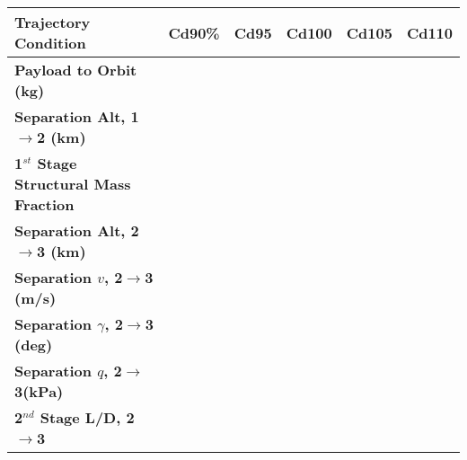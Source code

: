 \begin{table}[ht]
\begin{tabular}{l c c c c c} 
	\hline \textbf{Trajectory Condition}
	&Cd90\%
	&Cd95
	&Cd100
	&Cd105
	&Cd110
	\\
	\hline \textbf{Payload to Orbit (kg)}
	& \PayloadToOrbitCdninetypercent
	& \PayloadToOrbitCdninetyfivepercent
	& \PayloadToOrbitCdonehundredpercent
	& \PayloadToOrbitCdonehundredandfivepercent
	& \PayloadToOrbitCdonehundredandtenpercent
	\\
	\textbf{Separation Alt, 1$\rightarrow$2 (km)}
	& \firstsecondSeparationAltCdninetypercent
	& \firstsecondSeparationAltCdninetyfivepercent
	& \firstsecondSeparationAltCdonehundredpercent
	& \firstsecondSeparationAltCdonehundredandfivepercent
	& \firstsecondSeparationAltCdonehundredandtenpercent
	\\
	\textbf{1$^{st}$ Stage Structural Mass Fraction}
	& \FirstStageSMFCdninetypercent
	& \FirstStageSMFCdninetyfivepercent
	& \FirstStageSMFCdonehundredpercent
	& \FirstStageSMFCdonehundredandfivepercent
	& \FirstStageSMFCdonehundredandtenpercent
	\\
	\textbf{Separation Alt, 2$\rightarrow$3 (km)}
	& \secondthirdSeparationAltCdninetypercent
	& \secondthirdSeparationAltCdninetyfivepercent
	& \secondthirdSeparationAltCdonehundredpercent
	& \secondthirdSeparationAltCdonehundredandfivepercent
	& \secondthirdSeparationAltCdonehundredandtenpercent
	\\
	\textbf{Separation $v$, 2$\rightarrow$3 (m/s)}
	& \secondthirdSeparationvCdninetypercent
	& \secondthirdSeparationvCdninetyfivepercent
	& \secondthirdSeparationvCdonehundredpercent
	& \secondthirdSeparationvCdonehundredandfivepercent
	& \secondthirdSeparationvCdonehundredandtenpercent
	\\
	\textbf{Separation $\gamma$, 2$\rightarrow$3 (deg)}
	& \secondthirdSeparationgammaCdninetypercent
	& \secondthirdSeparationgammaCdninetyfivepercent
	& \secondthirdSeparationgammaCdonehundredpercent
	& \secondthirdSeparationgammaCdonehundredandfivepercent
	& \secondthirdSeparationgammaCdonehundredandtenpercent
	\\
	\textbf{Separation $q$, 2$\rightarrow$3(kPa)}
	& \secondthirdSeparationqCdninetypercent
	& \secondthirdSeparationqCdninetyfivepercent
	& \secondthirdSeparationqCdonehundredpercent
	& \secondthirdSeparationqCdonehundredandfivepercent
	& \secondthirdSeparationqCdonehundredandtenpercent
	\\
	\textbf{2$^{nd}$ Stage L/D, 2$\rightarrow$3}
	& \secondthirdSeparationLDCdninetypercent

\end{tabular}
\end{table}
